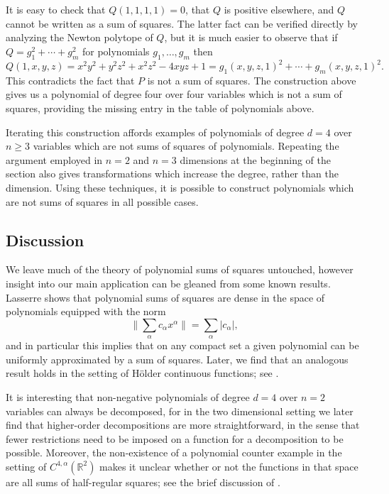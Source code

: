 \documentclass[oneside,hidelinks,indentfirst,10pt]{book}
\begin{document}
It is easy to check that \(Q(1,1,1,1)=0\), that \(Q\) is positive elsewhere, and \(Q\) cannot be written as a sum of squares. The latter fact can be verified directly by analyzing the Newton polytope of \(Q\), but it is much easier to observe that if \(Q=g_1^2+\cdots+g_m^2\) for polynomials \(g_1,\dots,g_m\) then
\[
    Q(1,x,y,z)=x^2y^2+y^2z^2+x^2z^2-4xyz+1=g_1(x,y,z,1)^2+\cdots+g_m(x,y,z,1)^2.
\]
This contradicts the fact that \(P\) is not a sum of squares. The construction above gives us a polynomial of degree four over four variables which is not a sum of squares, providing the missing entry in the table of polynomials above. 


Iterating this construction affords examples of polynomials of degree \(d=4\) over \(n\geq 3\) variables which are not sums of squares of polynomials. Repeating the argument employed in \(n=2\) and \(n=3\) dimensions at the beginning of the section also gives transformations which increase the degree, rather than the dimension. Using these techniques, it is possible to construct polynomials which are not sums of squares in all possible cases.


\subsection{Discussion}


We leave much of the theory of polynomial sums of squares untouched, however insight into our main application can be gleaned from some known results. Lasserre \cite{lasserre} shows that polynomial sums of squares are dense in the space of polynomials equipped with the norm
\[
    \bigg\|\sum_\alpha c_\alpha x^\alpha\bigg\|=\sum_{\alpha}|c_\alpha|,
\]
and in particular this implies that on any compact set a given polynomial can be uniformly approximated by a sum of squares. Later, we find that an analogous result holds in the setting of H\"older continuous functions; see .


It is interesting that non-negative polynomials of degree \(d=4\) over \(n=2\) variables can always be decomposed, for in the two dimensional setting we later find that higher-order decompositions are more straightforward, in the sense that fewer restrictions need to be imposed on a function for a decomposition to be possible. Moreover, the non-existence of a polynomial counter example in the setting of \(C^{4,\alpha}(\mathbb{R}^2)\) makes it unclear whether or not the functions in that space are all sums of half-regular squares; see the brief discussion of .
\end{document}
